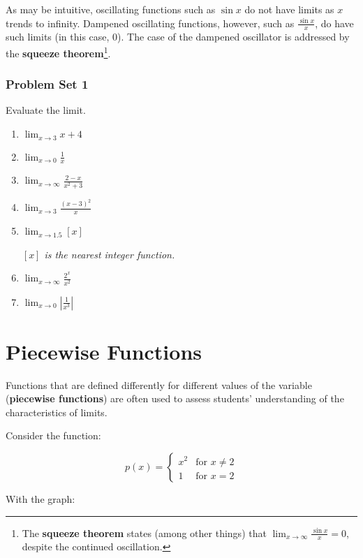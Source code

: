 \documentclass[10pt,a4paper]{book}
\begin{document}
As may be intuitive, oscillating functions such as $\sin x$ do not have limits as $x$ trends to infinity. Dampened oscillating functions, however, such as $\frac{\sin x}{x}$, do have such limits (in this case, 0). The case of the dampened oscillator is addressed by the \textbf{squeeze theorem}\footnote{The \textbf{squeeze theorem} states (among other things) that $\displaystyle \lim_{x \to \infty} {\frac{\sin x}{x}} = 0$, despite the continued oscillation.}.
\subsubsection{Problem Set 1}
Evaluate the limit.
\begin{multicols}{2}
\begin{enumerate}
	\item $\displaystyle \lim_{x \to 3} {x+4}$
    \item $\displaystyle \lim_{x \to 0} {\frac{1}{x}}$
    \item $\displaystyle \lim_{x \to \infty} {\frac{2-x}{x^{2}+3}}$
    \item $\displaystyle \lim_{x \to 3} {\frac{\left(x-3\right)^{2}}{x}}$
    \item $\displaystyle \lim_{x \to 1.5} {\left[x\right]}$\
    
    \textit{$\left[x\right]$ is the nearest integer function.}
    \item $\displaystyle \lim_{x \to \infty} {\frac{2^{x}}{x^{2}}}$
    \item $\displaystyle \lim_{x \to 0} {\left|\frac{1}{x^{3}}\right|}$
\end{enumerate}
\end{multicols}
\section{Piecewise Functions}
Functions that are defined differently for different values of the variable (\textbf{piecewise functions}) are often used to assess students' understanding of the characteristics of limits.

Consider the function:

\[
p(x) = \left\{
	\begin{array}{lr}
       x^{2} & \text{for } x \neq 2\\
       1 & \text{for } x = 2
     \end{array}
   \right.
\]

With the graph:

\end{document}
